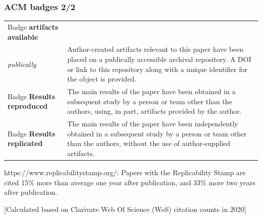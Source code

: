 \begin{frame}
\frametitle{ACM badges 2/2}

\begin{tabular}{|p{5cm}|p{9cm}|}
   \hline 
Badge \textbf{artifacts available} \\ \textit{publically} & Author-created artifacts relevant to this paper have been placed on a publically accessible archival repository. A DOI or link to this repository along with a unique identifier for the object is provided. \\
  \hline
Badge \textbf{Results reproduced}& The main results of the paper have been obtained in a subsequent study by a person or team other than the authors, using, in part, artifacts provided by the author. \\
  \hline
Badge \textbf{Results replicated} & The main results of the paper have been independently obtained in a subsequent study by a person or team other than the authors, without the use of author-supplied artifacts. \\ 
  \hline 
\end{tabular}
https://www.replicabilitystamp.org/: Papers with the Replicability Stamp are cited 15$\%$ more than average one year after publication, and 33$\%$ more two years after publication.

[Calculated based on Clarivate Web Of Science (WoS) citation counts in 2020]

\end{frame}


